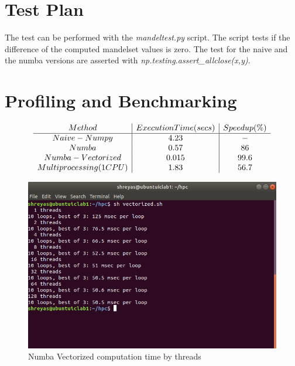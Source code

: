\documentclass{article}
\begin{document}
\section{Test Plan}
The test can be performed with the \textit{mandeltest.py} script. The script tests if the difference of the computed mandelset values is zero. The test for the naive and the numba versions are asserted with \textit{np.testing.assert\_allclose(x,y)}. 


\section{Profiling and Benchmarking}

\begin{align}
    \begin{array}{c | c | c}
         Method  & Execution Time (secs) & Speedup(\%) \\ 
         \hline %
         Naive-Numpy   & 4.23 & - \\
         Numba      & 0.57 &  86  \\
         Numba - Vectorized & 0.015 & 99.6 \\
         Multiprocessing(1 CPU) & 1.83 & 56.7 \\
    \end{array}
\end{align}


\begin{figure}[h!]
    \centering
    \includegraphics[scale=0.4]{threads_vectorized.png}
    \caption{Numba Vectorized computation time by threads}
    \label{fig:numba_vec}
\end{figure}
\end{document}
